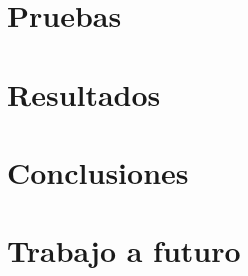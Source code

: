 \documentclass[10pt]{book}
\begin{document}
\chapter{Pruebas}\label{chp:pruebas} 
\hypertarget{chp:pruebas}{}

\chapter{Resultados}\label{chp:resultados} 
\hypertarget{chp:resultados}{}

\chapter{Conclusiones}\label{chp:conclusiones} 
\hypertarget{chp:conclusiones}{}

\chapter{Trabajo a futuro}\label{chp:trabajoFuturo} 
\hypertarget{chp:trabajoFuturo}{}



\end{document}

